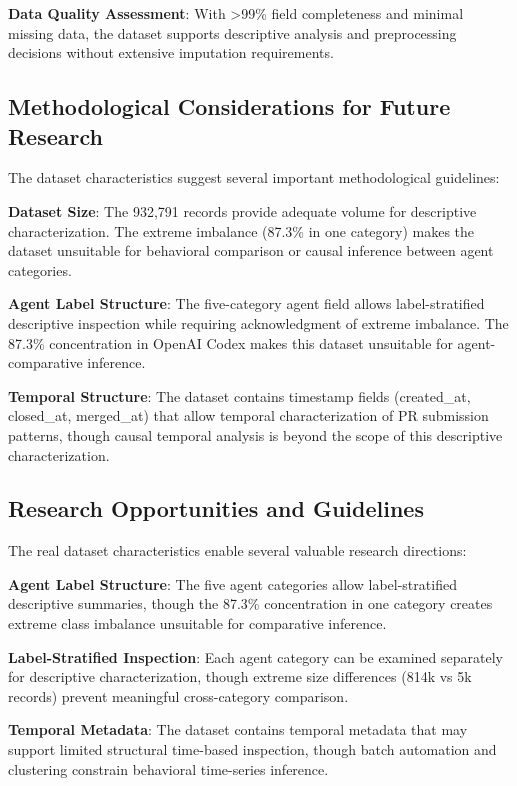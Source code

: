 \documentclass[conference]{IEEEtran}
\begin{document}
\textbf{Data Quality Assessment}: With >99\% field completeness and minimal missing data, the dataset supports descriptive analysis and preprocessing decisions without extensive imputation requirements.

\subsection{Methodological Considerations for Future Research}

The dataset characteristics suggest several important methodological guidelines:

\textbf{Dataset Size}: The 932,791 records provide adequate volume for descriptive characterization. The extreme imbalance (87.3\% in one category) makes the dataset unsuitable for behavioral comparison or causal inference between agent categories.

\textbf{Agent Label Structure}: The five-category agent field allows label-stratified descriptive inspection while requiring acknowledgment of extreme imbalance. The 87.3\% concentration in OpenAI Codex makes this dataset unsuitable for agent-comparative inference.

\textbf{Temporal Structure}: The dataset contains timestamp fields (created_at, closed_at, merged_at) that allow temporal characterization of PR submission patterns, though causal temporal analysis is beyond the scope of this descriptive characterization.

\subsection{Research Opportunities and Guidelines}

The real dataset characteristics enable several valuable research directions:

\textbf{Agent Label Structure}: The five agent categories allow label-stratified descriptive summaries, though the 87.3\% concentration in one category creates extreme class imbalance unsuitable for comparative inference.

\textbf{Label-Stratified Inspection}: Each agent category can be examined separately for descriptive characterization, though extreme size differences (814k vs 5k records) prevent meaningful cross-category comparison.

\textbf{Temporal Metadata}: The dataset contains temporal metadata that may support limited structural time-based inspection, though batch automation and clustering constrain behavioral time-series inference.
\end{document}
